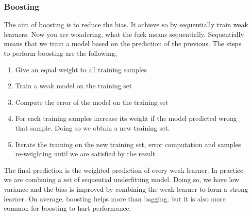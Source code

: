 \documentclass[../main.tex]{subfiles}
\begin{document}
\subsubsection{Boosting}
The aim of boosting is to reduce the bias. It achieve so by sequentially train weak learners\footnotemark. Now you are wondering, what the fuck means sequentially.
Sequentially means that we train a model based on the prediction of the previous.
The steps to perform boosting are the following,
\begin{enumerate}
    \item Give an equal weight to all training samples
    \item Train a weak model on the training set
    \item Compute the error of the model on the training set
    \item For each training samples increase its weight if the model predicted wrong that sample. Doing so we obtain a new training set.
    \item Iterate the training on the new training set, error computation and samples re-weighting until we are satisfied by the result
\end{enumerate}
The final prediction is the weighted prediction of every weak learner. In practice we are combining a set of sequential underfitting model. Doing so, we have low variance and the bias is improved by combining the weak learner to form a strong learner.
On average, boosting helps more than bagging, but it is also more common for boosting to hurt performance.

\newpage
\end{document}
